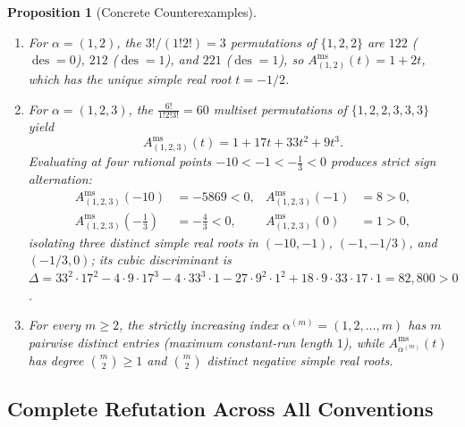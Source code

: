 \documentclass[11pt]{article}
\newtheorem{proposition}[theorem]{Proposition}
\theoremstyle{definition}
\newcommand{\des}{\operatorname{des}}
\begin{document}
\begin{proposition}[Concrete Counterexamples]\label{prop:concrete}
\begin{enumerate}
  \item For $\alpha = (1,2)$, the $3!/(1!2!)=3$ permutations of $\{1,2,2\}$ are
  $122$ ($\des=0$), $212$ ($\des=1$), and $221$ ($\des=1$), so
  $A_{(1,2)}^{\mathrm{ms}}(t) = 1 + 2t$, which has the unique simple real root $t = -1/2$.
  \item For $\alpha = (1,2,3)$, the $\frac{6!}{1!2!3!} = 60$ multiset permutations of
  $\{1,2,2,3,3,3\}$ yield
  \begin{equation}\label{eq:A123}
    A_{(1,2,3)}^{\mathrm{ms}}(t) = 1 + 17t + 33t^2 + 9t^3.
  \end{equation}
  Evaluating at four rational points $-10 < -1 < -\frac{1}{3} < 0$ produces strict sign
  alternation:
  \begin{align*}
    A_{(1,2,3)}^{\mathrm{ms}}(-10) &= -5869 < 0, &
    A_{(1,2,3)}^{\mathrm{ms}}(-1) &= 8 > 0, \\
    A_{(1,2,3)}^{\mathrm{ms}}\!\left(-\tfrac{1}{3}\right) &= -\tfrac{4}{3} < 0, &
    A_{(1,2,3)}^{\mathrm{ms}}(0) &= 1 > 0,
  \end{align*}
  isolating three distinct simple real roots in $(-10,-1)$, $(-1,-1/3)$, and $(-1/3,0)$; its
  cubic discriminant is $\Delta = 33^2\cdot 17^2 - 4\cdot 9\cdot 17^3 - 4\cdot 33^3\cdot 1
  - 27\cdot 9^2\cdot 1^2 + 18\cdot 9\cdot 33\cdot 17\cdot 1 = 82{,}800 > 0$.
  \item For every $m \ge 2$, the strictly increasing index $\alpha^{(m)} = (1,2,\dots,m)$ has
  $m$ pairwise distinct entries (maximum constant-run length $1$), while
  $A_{\alpha^{(m)}}^{\mathrm{ms}}(t)$ has degree $\binom{m}{2} \ge 1$ and $\binom{m}{2}$
  distinct negative simple real roots.
\end{enumerate}
\end{proposition}

\subsection{Complete Refutation Across All Conventions}
\end{document}
